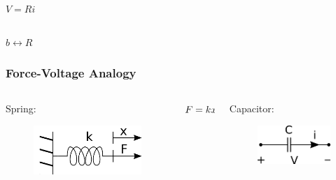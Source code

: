 \begin{frame}
\begin{columns}
		\begin{column}{0.25\linewidth}
			\hspace{3pt}
			$V = Ri$
		\end{column}
		
	\end{columns}
	
	\begin{center}
		$\boxed{b \leftrightarrow R} $	
	\end{center}
\end{frame}

\begin{frame}
	\frametitle{Force-Voltage Analogy}
	\begin{columns}
		\begin{column}{0.25\linewidth}
			Spring:
			\begin{figure}
				\includegraphics[width=1\linewidth]{img/spring}
			\end{figure}
		\end{column}
		
		\begin{column}{0.25\linewidth}
			\hspace{3pt}
			$F = kx \newline \Rightarrow \frac{df}{dt} = k\frac{dx}{dt}$ 
		\end{column}
		
		\begin{column}{0.25\linewidth}
			Capacitor:
			\begin{figure}
				\includegraphics[width=1\linewidth]{img/capacitor}
				\label{fig:capacitor}
			\end{figure}
		\end{column}
		

\end{columns}
\end{frame}
